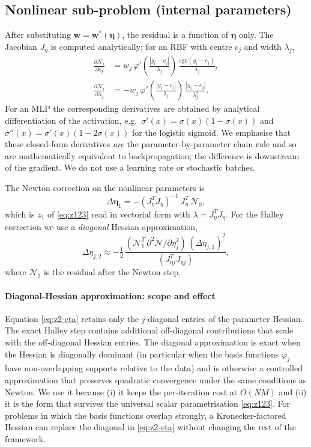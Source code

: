 \documentclass[preprint,12pt,numbers]{elsarticle}
\begin{document}
\subsection{Nonlinear sub-problem (internal parameters)}

After substituting $\mathbf{w} = \mathbf{w}^*(\boldsymbol{\eta})$, the
residual is a function of $\boldsymbol{\eta}$ only. The Jacobian
$J_\eta$ is computed analytically; for an RBF with centre $c_j$ and
width $\lambda_j$,
\begin{align}
\frac{\partial\mathcal{N}_i}{\partial c_j} &=
w_j\,\varphi'\!\left(\frac{|y_i - c_j|}{\lambda_j}\right)\,\frac{\mathrm{sgn}(y_i - c_j)}{\lambda_j},
\\
\frac{\partial\mathcal{N}_i}{\partial\lambda_j} &=
-w_j\,\varphi'\!\left(\frac{|y_i - c_j|}{\lambda_j}\right)\,\frac{|y_i - c_j|}{\lambda_j^2}.
\end{align}
For an MLP the corresponding derivatives are obtained by analytical
differentiation of the activation, e.g.\ $\sigma'(x) = \sigma(x)(1-\sigma(x))$
and $\sigma''(x) = \sigma'(x)(1-2\sigma(x))$ for the logistic sigmoid.
We emphasise that these closed-form derivatives \emph{are} the
parameter-by-parameter chain rule and so are mathematically equivalent
to backpropagation; the difference is downstream of the gradient. We do
not use a learning rate or stochastic batches.

The Newton correction on the nonlinear parameters is
\begin{equation}
\Delta\boldsymbol{\eta}_1 = -(J_\eta^T J_\eta)^{-1}\,J_\eta^T\,\mathcal{N}_0,
\label{eq:z1-eta}
\end{equation}
which is $z_1$ of \eqref{eq:z123} read in vectorial form with
$\lambda = J_\eta^T J_\eta$. For the Halley correction we use a
\emph{diagonal} Hessian approximation,
\begin{equation}
\Delta\eta_{j,2} \approx -\tfrac{1}{2}\,\frac{(\mathcal{N}_1^T\,\partial^2\mathcal{N}/\partial\eta_j^2)\,(\Delta\eta_{j,1})^2}
{(J_{\eta j}^T J_{\eta j})},
\label{eq:z2-eta}
\end{equation}
where $\mathcal{N}_1$ is the residual after the Newton step.

\paragraph{Diagonal-Hessian approximation: scope and effect}
Equation \eqref{eq:z2-eta} retains only the $j$-diagonal entries of the
parameter Hessian. The exact Halley step contains additional off-diagonal
contributions that scale with the off-diagonal Hessian entries. The
diagonal approximation is exact when the Hessian is diagonally dominant
(in particular when the basis functions $\varphi_j$ have non-overlapping
supports relative to the data) and is otherwise a controlled approximation
that preserves quadratic convergence under the same conditions as Newton.
We use it because (i) it keeps the per-iteration cost at $O(NM)$ and
(ii) it is the form that survives the universal scalar parametrisation
\eqref{eq:z123}. For problems in which the basis functions overlap
strongly, a Kronecker-factored Hessian \cite{MartensGrosse2015} can
replace the diagonal in \eqref{eq:z2-eta} without changing the rest of
the framework.
\end{document}
